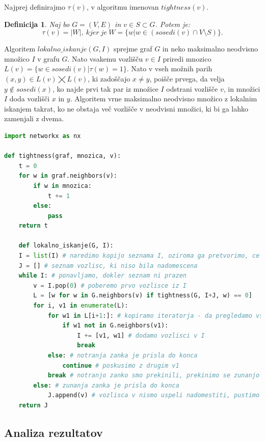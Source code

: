 \documentclass[a4paper, 12pt]{article}
\newtheorem{definicija}{Definicija}
\begin{document}
Najprej definirajmo $\tau(v)$, v algoritmu imenovan $tightness(v)$.
\begin{definicija}
	Naj bo $G=(V,E)$ in $v \in S \subset G$. Potem je:
	$$\tau(v) = |W|, \ kjer \ je \ W = \{w|w \in (sosedi(v) \cap V \setminus S)\}.$$
\end{definicija}

\noindent Algoritem $lokalno\_iskanje(G, I)$ sprejme graf $G$ in neko maksimalno neodvisno množico $I$ v grafu $G$. Nato vsakemu vozlišču $v \in I$
priredi mnozico $L(v) = \{w \in sosedi(v)| \tau(w) = 1\}$. Nato v vseh možnih parih $(x, y) \in L(v) \bigtimes L(v)$, ki zadoščajo $x \neq y$, 
poišče prvega, da velja $y \notin sosedi(x)$, ko najde prvi tak par iz množice $I$ odstrani vozlišče $v$, in množici $I$ doda vozlišči $x$ in $y$. 
Algoritem vrne maksimalno neodvisno množico z lokalnim iskanjem takrat, ko ne obstaja več vozlišče v neodvisni množici, ki bi ga lahko zamenjali z dvema.

\begin{lstlisting}[language=Python, basicstyle=\tiny]
import networkx as nx

def tightness(graf, mnozica, v): 
    t = 0
    for w in graf.neighbors(v):
        if w in mnozica:
            t += 1
        else:
            pass
    return t

    def lokalno_iskanje(G, I):
    I = list(I) # naredimo kopijo seznama I, oziroma ga pretvorimo, ce ni v obliki seznama
    J = [] # seznam vozlisc, ki niso bila nadomescena
    while I: # ponavljamo, dokler seznam ni prazen
        v = I.pop(0) # poberemo prvo vozlisce iz I
        L = [w for w in G.neighbors(v) if tightness(G, I+J, w) == 0]
        for i, v1 in enumerate(L):
            for w1 in L[i+1:]: # kopiramo iteratorja - da pregledamo vsak par enkrat
                if w1 not in G.neighbors(v1):
                    I += [v1, w1] # dodamo vozlisci v I
                    break
            else: # notranja zanka je prisla do konca
                continue # poskusimo z drugim v1
            break # notranjo zanko smo prekinili, prekinimo se zunanjo
        else: # zunanja zanka je prisla do konca
            J.append(v) # vozlisca v nismo uspeli nadomestiti, pustimo ga v izhodu
    return J
\end{lstlisting}

\subsection{Analiza rezultatov}
\end{document}
